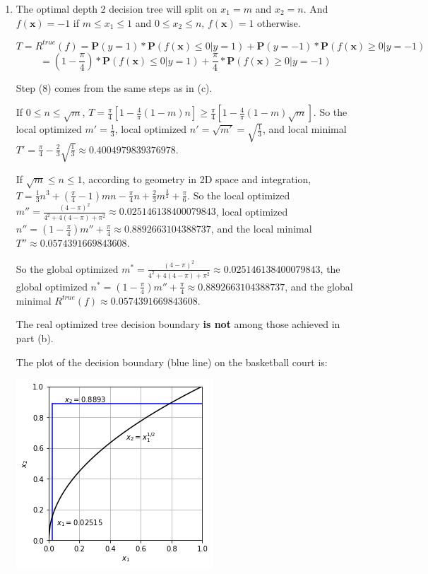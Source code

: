 \documentclass[paper=letter, fontsize=12pt]{article}
\begin{document}
\begin{enumerate}[label=(\alph*)]
	\item The optimal depth 2 decision tree will split on $x_1 = m$ and $x_2 = n$. And $f(\mathbf{x}) = -1$ if $m \leq x_1 \leq 1$ and $0 \leq x_2 \leq n$, $f(\mathbf{x}) = 1$ otherwise.
	
	\begin{equation}
	T = R^{true}(f) = \mathbf{P}(y = 1) * \mathbf{P}(f(\mathbf{x}) \leq 0 | y = 1) + \mathbf{P}(y = -1) * \mathbf{P}(f(\mathbf{x}) \geq 0 | y = -1)
	\end{equation}
	\begin{equation}
	= (1 - \frac{\pi}{4}) * \mathbf{P}(f(\mathbf{x}) \leq 0 | y = 1) + \frac{\pi}{4} * \mathbf{P}(f(\mathbf{x}) \geq 0 | y = -1)
	\end{equation}
	
	Step (8) comes from the same steps as in (c).
	
	If $0 \leq n \leq \sqrt{m}$, $T = \frac{\pi}{4} [1 - \frac{4}{\pi} (1-m)n] \geq \frac{\pi}{4} [1 - \frac{4}{\pi} (1-m) \sqrt{m}]$. So the local optimized $m' = \frac{1}{3}$, local optimized $n' = \sqrt{m'} = \sqrt{\frac{1}{3}}$, and local minimal $T' = \frac{\pi}{4} - \frac{2}{3}\sqrt{\frac{1}{3}} \approx 0.4004979839376978$.
	
	If $\sqrt{m} \leq n \leq 1$, according to geometry in 2D space and integration, $T = \frac{1}{3}n^3 + (\frac{\pi}{4} - 1)mn - \frac{\pi}{4}n + \frac{2}{3} m^{\frac{3}{2}} + \frac{\pi}{6}$. So the local optimized $m'' = \frac{{(4-\pi)}^2}{4^2 + 4(4-\pi) + {\pi}^2} \approx 0.025146138400079843$, local optimized $n'' = (1 - \frac{\pi}{4})m'' + \frac{\pi}{4} \approx 0.8892663104388737$, and the local minimal $T'' \approx 0.0574391669843608$.
	
	So the global optimized $m^*= \frac{{(4-\pi)}^2}{4^2 + 4(4-\pi) + {\pi}^2} \approx \mathbf{0.025146138400079843}$, the global optimized $n^* = (1 - \frac{\pi}{4})m'' + \frac{\pi}{4} \approx \mathbf{0.8892663104388737}$, and the global minimal $R^{true}(f) \approx \mathbf{0.0574391669843608}$.
	
	The real optimized tree decision boundary \textbf{is not} among those achieved in part (b).
	
	The plot of the decision boundary (blue line) on the basketball court is:
	
	\includegraphics[scale=0.6]{q1d.png}
	

\end{enumerate}
\end{document}
